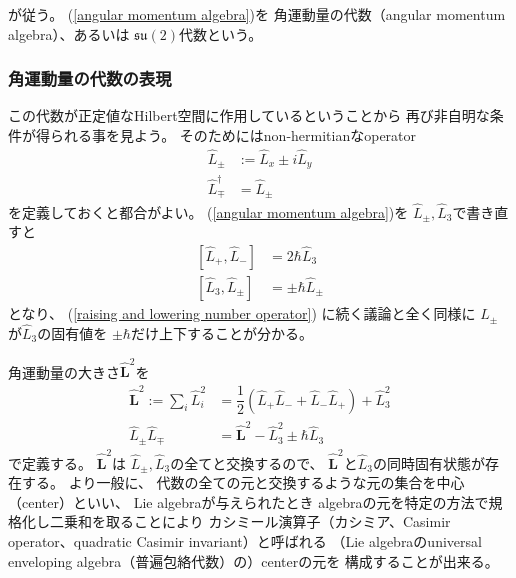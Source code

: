 が従う。
(\ref{angular momentum algebra})を
角運動量の代数（angular momentum algebra）、あるいは
$\mathfrak{su}(2)$代数という。

\subsubsection{角運動量の代数の表現}

この代数が正定値なHilbert空間に作用しているということから
再び非自明な条件が得られる事を見よう。
そのためにはnon-hermitianなoperator
\begin{align}
    \hat{L}_\pm
    &:=
    \hat{L}_x
    \pm
    i \hat{L}_y
\\
    \hat{L}_\mp^\dagger
    &=
    \hat{L}_\pm
\end{align}
を定義しておくと都合がよい。
(\ref{angular momentum algebra})を
$\hat{L}_\pm, \hat{L}_3$で書き直すと
\begin{subequations}
\begin{align}
    [\hat{L}_+, \hat{L}_-]
    &= 2 \hbar \hat{L}_3
\\
    [\hat{L}_3, \hat{L}_\pm]
    &= \pm \hbar \hat{L}_\pm
\label{angular momentum creation annihilation}
\end{align}
\label{angular momentum algebra with L_pm}
\end{subequations}
となり、
(\ref{raising and lowering number operator})
に続く議論と全く同様に
$\hat{L}_\pm$が$\hat{L}_3$の固有値を
$\pm \hbar$だけ上下することが分かる。

角運動量の大きさ$\hat{\bm{L}}^2$を
\begin{align}
    \hat{\bm{L}}^2
    := \sum_i \hat{L}_i^2
&=
    \dfrac{1}{2}
    \left(
        \hat{L}_+ \hat{L}_-
    +
        \hat{L}_- \hat{L}_+
    \right)
    +
    \hat{L}_3^2
\\
    \hat{L}_\pm \hat{L}_\mp
    &=
    \hat{\bm{L}}^2 - \hat{L}_3^2
    \pm \hbar \hat{L}_3
\label{angular momentum raising lowering into l^2 and l_3}
\end{align}
で定義する。
$\hat{\bm{L}}^2$は
$\hat{L}_\pm, \hat{L}_3$の全てと交換するので、
$\hat{\bm{L}}^2$と$\hat{L}_3$の同時固有状態が存在する。
より一般に、
代数の全ての元と交換するような元の集合を中心（center）といい、
Lie algebraが与えられたとき
algebraの元を特定の方法で規格化し二乗和を取ることにより
カシミール演算子（カシミア、Casimir operator、quadratic Casimir invariant）と呼ばれる
（Lie algebraのuniversal enveloping algebra（普遍包絡代数）の）centerの元を
構成することが出来る。

